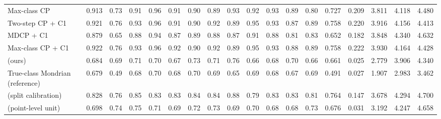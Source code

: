 \begin{table}[!htbp]
{\begin{tabular}{lccccccccccccccccc}
Max-class CP & 0.913 & 0.73 & 0.91 & 0.96 & 0.91 & 0.90 & 0.89 & 0.93 & 0.92 & 0.93 & 0.89 & 0.80 & 0.727 & 0.209 & 3.811 & 4.118 & 4.480 \\
Two-step CP + C1 & 0.921 & 0.76 & 0.93 & 0.96 & 0.91 & 0.90 & 0.92 & 0.89 & 0.95 & 0.93 & 0.87 & 0.89 & 0.758 & 0.220 & 3.916 & 4.156 & 4.413 \\
MDCP + C1 & 0.879 & 0.65 & 0.88 & 0.94 & 0.87 & 0.89 & 0.88 & 0.87 & 0.91 & 0.88 & 0.81 & 0.83 & 0.652 & 0.182 & 3.848 & 4.340 & 4.632 \\
Max-class CP + C1 & 0.922 & 0.76 & 0.93 & 0.96 & 0.92 & 0.90 & 0.92 & 0.89 & 0.95 & 0.93 & 0.88 & 0.89 & 0.758 & 0.222 & 3.930 & 4.164 & 4.428 \\
\gamut{} (ours) & 0.684 & 0.69 & 0.71 & 0.70 & 0.67 & 0.73 & 0.71 & 0.76 & 0.66 & 0.68 & 0.70 & 0.66 & 0.661 & 0.025 & 2.779 & 3.906 & 4.340 \\
True-class Mondrian (reference) & 0.679 & 0.49 & 0.68 & 0.70 & 0.68 & 0.70 & 0.69 & 0.65 & 0.69 & 0.68 & 0.67 & 0.69 & 0.491 & 0.027 & 1.907 & 2.983 & 3.462 \\
\gamut{} (split calibration) & 0.828 & 0.76 & 0.85 & 0.83 & 0.83 & 0.84 & 0.84 & 0.88 & 0.79 & 0.83 & 0.83 & 0.81 & 0.764 & 0.147 & 3.678 & 4.294 & 4.700 \\
\gamut{} (point-level unit) & 0.698 & 0.74 & 0.75 & 0.71 & 0.69 & 0.72 & 0.73 & 0.69 & 0.70 & 0.68 & 0.68 & 0.73 & 0.676 & 0.031 & 3.192 & 4.247 & 4.658 \\
\bottomrule
\end{tabular}}
\end{table}

